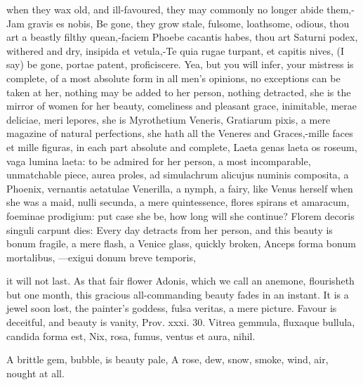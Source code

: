 {when they wax old, and ill-favoured, they may commonly no longer abide
them,-Jam gravis es nobis, Be gone, they grow stale, fulsome,
loathsome, odious, thou art a beastly filthy quean,-faciem Phoebe
cacantis habes, thou art Saturni podex, withered and dry, insipida et
vetula,-Te quia rugae turpant, et capitis nives, (I say) be gone,
portae patent, proficiscere.
Yea, but you will infer, your mistress is complete, of a most absolute
form in all men's opinions, no exceptions can be taken at her, nothing
may be added to her person, nothing detracted, she is the mirror of
women for her beauty, comeliness and pleasant grace, inimitable, merae
deliciae, meri lepores, she is Myrothetium Veneris, Gratiarum pixis, a
mere magazine of natural perfections, she hath all the Veneres and
Graces,-mille faces et mille figuras, in each part absolute and
complete, Laeta genas laeta os roseum, vaga lumina laeta: to be
admired for her person, a most incomparable, unmatchable piece, aurea
proles, ad simulachrum alicujus numinis composita, a Phoenix, vernantis
aetatulae Venerilla, a nymph, a fairy, like Venus herself when
she was a maid, nulli secunda, a mere quintessence, flores spirans et
amaracum, foeminae prodigium: put case she be, how long will she
continue? Florem decoris singuli carpunt dies: Every day detracts
from her person, and this beauty is bonum fragile, a mere flash, a
Venice glass, quickly broken,
Anceps forma bonum mortalibus,
---exigui donum breve temporis,

it will not last. As that fair flower Adonis, which we call an
anemone, flourisheth but one month, this gracious all-commanding beauty
fades in an instant. It is a jewel soon lost, the painter's goddess,
fulsa veritas, a mere picture. Favour is deceitful, and beauty is
vanity, Prov. xxxi. 30.
Vitrea gemmula, fluxaque bullula, candida forma est,
Nix, rosa, fumus, ventus et aura, nihil.

A brittle gem, bubble, is beauty pale,
A rose, dew, snow, smoke, wind, air, nought at all.

}
